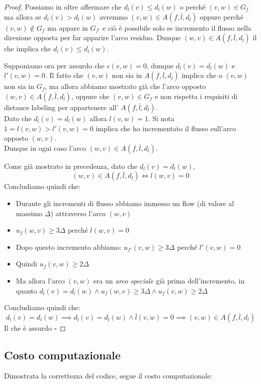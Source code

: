 \documentclass[a4paper, 11pt]{report}
\newcommand*{\QED}{\null\nobreak\hfill\ensuremath{\square}}%
\begin{document}
\begin{proof}
    Possiamo in oltre affermare che $d_l(v)\le d_l(w)$ o perché $(v,w) \in G_f$ ma allora se $d_l(v)> d_l(w)$ avremmo $(v,w) \in A(f,\bar{l}, d_l)$
    oppure perché $(v,w) \not \in G_f$ ma appare in $G_{f'}$ e ciò è possibile solo se incremento il flusso nella direzione opposta per far apparire l'arco residuo. Dunque $(w,v) \in A(f,\bar{l}, d_l)$ il che implica che $d_l(v)\le d_l(w)$.

    Supponiamo ora per assurdo che $c(v,w) = 0$, dunque $d_l(v) = d_l(w)$ e $l'(v,w) = 0$.
    Il fatto che $(v,w)$ non sia in $A(f,\bar{l}, d_l)$ implica che o $(v,w)$ non sia in $G_f$, ma allora abbiamo mostrato già che l'arco opposto $(w,v)\in A(f,\bar{l}, d_l)$, 
    oppure che $(v,w) \in G_f$ e non rispetta i requisiti di distance labeling per appartenere all' $A(f,\bar{l}, d_l)$.\\
    Dato che $d_l(v) = d_l(w)$ allora $l(v,w) = 1$. Si nota $1 = l(v,w) > l'(v,w) = 0$ implica che ho incrementato il flusso sull'arco opposto $(w,v)$.\\
    Dunque in ogni caso l'arco $(w,v)\in A(f,\bar{l}, d_l)$.

    Come già mostrato in precedenza, dato che $d_l(v) = d_l(w)$, \[(w,v)\in A(f,\bar{l}, d_l) \iff l(w,v) = 0\]
    Concludiamo quindi che: 
    \begin{itemize}
        \item Durante gli incrementi di flusso abbiamo immesso un flow (di valore al massimo $\Delta$) attraverso l'arco $(w,v)$
        \item $u_f(w,v) \ge 3\Delta$ perché $l(w,v) = 0$
        \item Dopo questo incremento abbiamo: $u_{f'}(v,w) \ge 3\Delta$ perché  $l'(v,w) = 0$
        \item Quindi $u_f(v,w) \ge 2\Delta$
        \item Ma allora l'arco $(v,w)$ era un \textit{arco speciale} già prima dell'incremento, in quanto $d_l(v) = d_l(w) \land u_f(w,v) \ge 3\Delta \land u_f(v,w) \ge 2\Delta$
    \end{itemize}
    Concludiamo quindi che: 
    \[d_l(v) = d_l(w) \implies d_{\bar{l}}(v) = d_{\bar{l}}(w) \land \bar{l}(v,w) = 0 \implies (v,w) \in A(f,\bar{l}, d_l)\]
    Il che è assurdo 
    \QED
    \end{proof}
    \subsection{Costo computazionale}
    Dimostrata la correttezza del codice, segue il costo computazionale:
\end{document}
